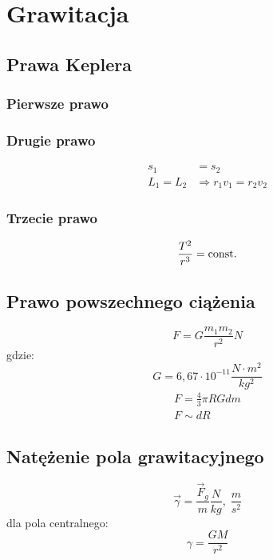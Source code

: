 \chapter{Grawitacja}
  \section{Prawa Keplera}
    \subsection{Pierwsze prawo}
    \subsection{Drugie prawo}
      \begin{align}
        s_1 &= s_2\\
        L_1 = L_2 &\Rightarrow r_1v_1 = r_2v_2
      \end{align}
    \subsection{Trzecie prawo}
      \begin{equation}
        \frac{T^2}{r^3} = \operatorname{const.}
      \end{equation}
  \section{Prawo powszechnego ciążenia}
    \begin{equation}
      F = G\frac{m_1m_2}{r^2} \unit{N}
    \end{equation}
    gdzie:
    \begin{equation}
      G = 6,67\cdot 10^{-11} \unit{\frac{N\cdot m^2}{kg^2}}
    \end{equation}
    \begin{gather}
      F = \frac{4}{3}\pi RGdm\\
      F \sim dR
    \end{gather}
  \section{Natężenie pola grawitacyjnego}
    \begin{equation}
      \vec\gamma = \frac{\vec F_g}{m} \unit{\frac{N}{kg},\;\frac{m}{s^2}}
    \end{equation}
    dla pola centralnego:
    \begin{equation}
      \gamma = \frac{GM}{r^2}
    \end{equation}
